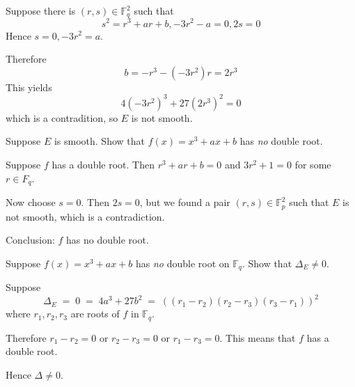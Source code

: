 \documentclass[a4paper]{scrreprt}
\newcommand\F{\mathbb F}
\begin{document}
Suppose there is $(r,s)\in\F_q^2$ such that
\[s^2=r^3+ar+b, -3r^2-a=0, 2s=0\]
Hence $s=0, -3r^2=a$.

Therefore
\[b=-r^3 - (-3r^2)r = 2r^3\]
This yields
\[4(-3r^2)^3+27(2r^3)^2 = 0\]
which is a contradition, so $E$ is not smooth.

\bigskip

 Suppose $E$ is smooth. Show that $f(x) = x^3+ax+b$ has \textit{no}
double root.

Suppose $f$ has a double root. Then $r^3+ar+b = 0$ and $3r^2+1=0$ for some $r\in F_q$.

Now choose $s=0$. Then $2s=0$, but we found a pair $(r,s)\in\F_p^2$ such that $E$ is
not smooth, which is a contradiction.

Conclusion: $f$ has no double root.

\bigskip

 Suppose $f(x)=x^3 + ax + b$ has \textit{no} double root on $\F_q$.
Show that $\Delta_E\neq0$.

Suppose \[\Delta_E\;=\;0\;=\;4a^3+27b^2\;=\;((r_1-r_2)(r_2-r_3)(r_3-r_1))^2\]
where $r_1,r_2,r_3$ are roots of $f$ in $\F_q$.

Therefore $r_1-r_2=0$ or $r_2-r_3=0$ or $r_1-r_3=0$. This means that $f$ has a double root.

Hence $\Delta\neq0$.
\end{document}
